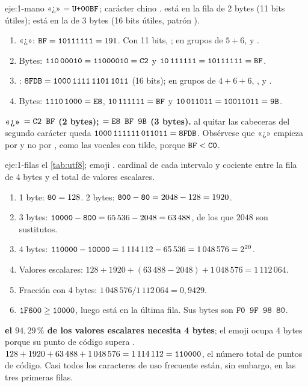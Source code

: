 \begin{solucion}{eje:1-mano}
\datos «¿» $=\texttt{U+00BF}$; carácter chino .
\planteamiento {} está en la fila de 2 bytes (11 bits útiles);  está en la de 3 bytes (16 bits útiles, patrón ).
\pasos
\begin{enumerate}[label=\arabic*.]
  \item «¿»: $\texttt{BF}=\texttt{10111111}=191$. Con 11 bits, ; en grupos de $5+6$,  y .
  \item Bytes: $\texttt{110}\,\texttt{00010}=\texttt{11000010}=\texttt{C2}$ y $\texttt{10}\,\texttt{111111}=\texttt{10111111}=\texttt{BF}$.
  \item {}: $\texttt{8FDB}=\texttt{1000\,1111\,1101\,1011}$ (16 bits); en grupos de $4+6+6$, ,  y .
  \item Bytes: $\texttt{1110}\,\texttt{1000}=\texttt{E8}$, $\texttt{10}\,\texttt{111111}=\texttt{BF}$ y $\texttt{10}\,\texttt{011011}=\texttt{10011011}=\texttt{9B}$.
\end{enumerate}
\resultado \textbf{«¿» $=\texttt{C2 BF}$ (2 bytes);  $=\texttt{E8 BF 9B}$ (3 bytes).}
\comprobacion al quitar las cabeceras del segundo carácter queda $\texttt{1000}\,\texttt{111111}\,\texttt{011011}=\texttt{8FDB}$. Obsérvese que «¿» empieza por  y no por , como las vocales con tilde, porque $\texttt{BF}<\texttt{C0}$.
\end{solucion}

\begin{solucion}{eje:1-filas}
\datos el \cref{tab:utf8}; emoji .
\planteamiento cardinal de cada intervalo y cociente entre la fila de 4 bytes y el total de valores escalares.
\pasos
\begin{enumerate}[label=\arabic*.]
  \item 1 byte: $\texttt{80}=128$. 2 bytes: $\texttt{800}-\texttt{80}=2048-128=1920$.
  \item 3 bytes: $\texttt{10000}-\texttt{800}=65\,536-2048=63\,488$, de los que $2048$ son sustitutos.
  \item 4 bytes: $\texttt{110000}-\texttt{10000}=1\,114\,112-65\,536=1\,048\,576=2^{20}$.
  \item Valores escalares: $128+1920+(63\,488-2048)+1\,048\,576=1\,112\,064$.
  \item Fracción con 4 bytes: $1\,048\,576/1\,112\,064=0{,}9429$.
  \item $\texttt{1F600}\ge\texttt{10000}$, luego está en la última fila. Sus bytes son $\texttt{F0 9F 98 80}$.
\end{enumerate}
\resultado \textbf{el $94{,}29\,\%$ de los valores escalares necesita 4 bytes}; el emoji ocupa 4 bytes porque su punto de código supera .
\comprobacion $128+1920+63\,488+1\,048\,576=1\,114\,112=\texttt{110000}$, el número total de puntos de código. Casi todos los caracteres de uso frecuente están, sin embargo, en las tres primeras filas.
\end{solucion}

